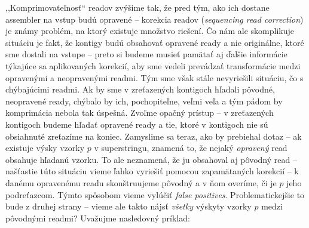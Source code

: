 ,,Komprimovateľnosť`` readov zvýšime tak, že pred tým, ako ich dostane assembler na vstup budú opravené -- korekcia readov (\emph{sequencing read correction}) je známy problém, na ktorý existuje množstvo riešení.  Čo nám ale skomplikuje situáciu je fakt, že kontigy budú obsahovať opravené ready a nie originálne, ktoré sme dostali na vstupe -- preto si budeme musieť pamätať aj ďalšie informácie týkajúce sa aplikovaných korekcií, aby sme vedeli prevádzať transformácie medzi opravenými a neopravenými readmi. Tým sme však stále nevyriešili situáciu, čo s chýbajúcimi readmi. Ak by sme v zreťazených kontigoch hľadali pôvodné, neopravené ready, chýbalo by ich, pochopiteľne, veľmi veľa a tým pádom by komprimácia nebola tak úspešná. Zvoľme opačný prístup -- v zreťazených kontigoch budeme hľadať opravené ready a tie, ktoré v kontigoch nie sú obsiahnuté zreťazíme na koniec. Zamyslime sa teraz, ako by prebiehal dotaz -- ak existuje výsky vzorky $p$ v superstringu, znamená to, že nejaký \emph{opravený} read obsahuje hľadanú vzorku. To ale neznamená, že ju obsahoval aj pôvodný read -- našťastie túto situáciu vieme ľahko vyriešiť pomocou zapamätaných korekcií -- k danému opravenému readu skonštruujeme pôvodný a v ňom overíme, či je $p$ jeho podreťazcom. Týmto spôsobom vieme vylúčiť \emph{false positives}. Problematickejšie to bude z druhej strany -- vieme ale takto nájsť \emph{všetky} výskyty vzorky $p$ medzi pôvodnými readmi? Uvažujme nasledovný príklad:

